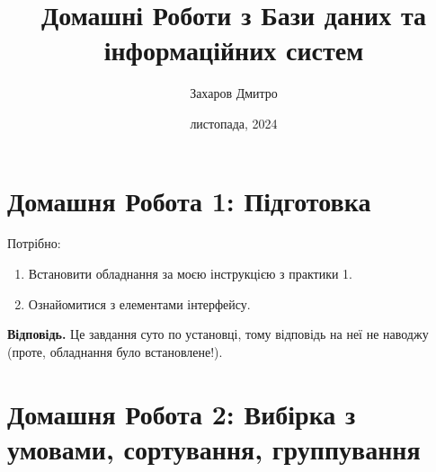 \documentclass{hw_template}
\title{\huge\sffamily\bfseries Домашні Роботи з Бази даних та інформаційних систем}
\author{\Large\sffamily Захаров Дмитро}
\date{\sffamily 28 листопада, 2024}
\begin{document}
\pagestyle{fancy}

\maketitle

\tableofcontents

\pagebreak

\section{Домашня Робота 1: Підготовка}

\begin{problem}

Потрібно:
\begin{enumerate}
    \item Встановити обладнання за моєю інструкцією з практики 1.
    \item Ознайомитися з елементами інтерфейсу.
\end{enumerate}

\end{problem}

\textbf{Відповідь.} Це завдання суто по установці, тому відповідь на неї не наводжу
(проте, обладнання було встановлене!).

\newpage

\section{Домашня Робота 2: Вибірка з умовами, сортування, группування}
\end{document}
